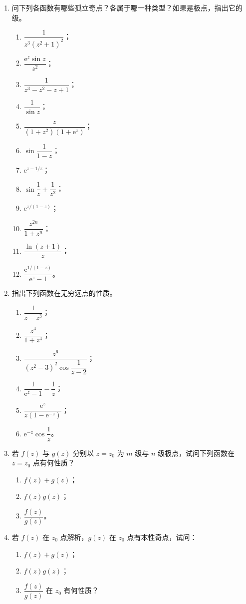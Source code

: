 \documentclass[UTF8,11pt,a4paper]{ctexart}
\newcommand{\ee}{\mathrm{e}}
\begin{document}
\begin{enumerate}
\item 问下列各函数有哪些孤立奇点？各属于哪一种类型？如果是极点，指出它的级。
  \begin{enumerate}
  \item $\dfrac1{z^3(z^2+1)^2}$；
  \item $\dfrac{\ee^z\sin z}{z^2}$；
  \item $\dfrac1{z^3-z^2-z+1}$；
  \item $\dfrac1{\sin z}$；
  \item $\dfrac z{(1+z^2)(1+\ee^z)}$；
  \item $\sin\dfrac1{1-z}$；
  \item $\ee^{z-1/z}$；
  \item $\sin\dfrac1z+\dfrac1{z^2}$；
  \item $\ee^{z/(1-z)}$；
  \item $\dfrac{z^{2n}}{1+z^n}$；
  \item $\dfrac{\ln(z+1)}z$；
  \item $\dfrac{\ee^{1/(1-z)}}{\ee^z-1}$。
  \end{enumerate}

\item 指出下列函数在无穷远点的性质。
  \begin{enumerate}
  \item $\dfrac1{z-z^3}$；
  \item $\dfrac{z^4}{1+z^4}$；
  \item $\dfrac{z^6}{(z^2-3)^2\cos\dfrac1{z-2}}$；
  \item $\dfrac1{\ee^z-1}-\dfrac1z$；
  \item $\dfrac{\ee^z}{z(1-\ee^{-z})}$；
  \item $\ee^{-z}\cos\dfrac1z$。
  \end{enumerate}

\item 若 $f(z)$ 与 $g(z)$ 分别以 $z=z_0$ 为 $m$ 级与 $n$ 级极点，试问下列函数在 $z=z_0$ 点有何性质？
  \begin{enumerate}
  \item $f(z)+g(z)$；
  \item $f(z)g(z)$；
  \item $\dfrac{f(z)}{g(z)}$。
  \end{enumerate}

\item 若 $f(z)$ 在 $z_0$ 点解析，$g(z)$ 在 $z_0$ 点有本性奇点，试问：
  \begin{enumerate}
  \item $f(z)+g(z)$；
  \item $f(z)g(z)$；
  \item $\dfrac{f(z)}{g(z)}$ 在 $z_0$ 有何性质？
  \end{enumerate}


\end{enumerate}
\end{document}
